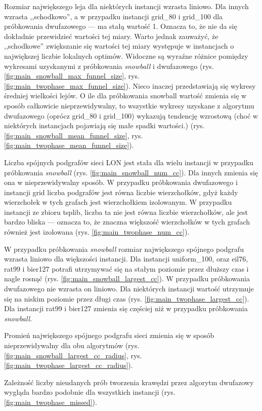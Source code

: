 Rozmiar największego leja dla niektórych instancji wzrasta liniowo. Dla innych wzrasta ,,schodkowo'', a w przypadku instancji grid\_80 i grid\_100 dla
próbkowania dwufazowego --- ma stałą wartość 1. Oznacza to, że nie da się dokładnie przewidzieć wartości tej miary. Warto jednak zauważyć, że
,,schodkowe'' zwiększanie się wartości tej miary występuje w instancjach o największej liczbie lokalnych optimów.
Widoczne są wyraźne różnice pomiędzy wykresami uzyskanymi z próbkowania \textit{snowball} i dwufazowego (rys. \ref{fig:main_snowball_max_funnel_size}, rys. \ref{fig:main_twophase_max_funnel_size}).
Nieco inaczej przedstawiają się wykresy średniej wielkości lejów. O ile dla próbkowania snowball wartość zmienia się w sposób całkowicie nieprzewidywalny,
to wszystkie wykresy uzyskane z algorytmu dwufazowego (oprócz grid\_80 i grid\_100) wykazują tendencję wzrostową (choć w niektórych instancjach pojawiają się małe spadki wartości.)
(rys. \ref{fig:main_snowball_mean_funnel_size}, rys. \ref{fig:main_twophase_mean_funnel_size}).

Liczba spójnych podgrafów sieci LON jest stała dla wielu instancji w przypadku próbkowania \textit{snowball} (rys. \ref{fig:main_snowball_num_cc}). Dla innych zmienia się ona w nieprzewidywalny sposób.
W przypadku próbkowania dwufazowego i instancji grid liczba podgrafów jest równa liczbie wierzchołków, gdyż każdy wierzchołek w tych grafach jest wierzchołkiem izolowanym.
W przypadku instancji ze zbioru tsplib, liczba ta nie jest równa liczbie wierzchołków, ale jest bardzo bliska --- oznacza to, że znaczna większość
wierzchołków w tych grafach również jest izolowana (rys. \ref{fig:main_twophase_num_cc}).

W przypadku próbkowania \textit{snowball} rozmiar największego spójnego podgrafu wzrasta liniowo dla większości instancji. Dla instancji uniform\_100, oraz
eil76, rat99 i bier127 potrafi utrzymywać się na stałym poziomie przez dłuższy czas i nagle rosnąć (rys. \ref{fig:main_snowball_largest_cc}).
W przypadku próbkowania dwufazowego nie wzrasta on liniowo. Dla niektórych instancji wartość utrzymuje się na niskim poziomie przez długi czas (rys. \ref{fig:main_twophase_largest_cc}).
Dla instancji rat99 i bier127 zmienia się częściej niż w przypadku próbkowania \textit{snowball}.

Promień największego spójnego podgrafu sieci zmienia się w sposób nieprzewidywalny dla obu algorytmów (rys. \ref{fig:main_snowball_largest_cc_radius}, rys. \ref{fig:main_twophase_largest_cc_radius}).

Zależność liczby nieudanych prób tworzenia krawędzi przez algorytm dwufazowy wygląda bardzo podobnie dla wszystkich instancji (rys. \ref{fig:main_twophase_missed}).

